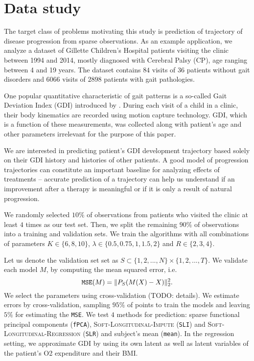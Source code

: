 \documentclass[preprint]{imsart}
\numberwithin{equation}{section}
\theoremstyle{plain}
\begin{document}
\section{Data study}

The target class of problems motivating this study is prediction of trajectory of disease progression from sparse observations. As an example application, we analyze a dataset of Gillette Children's Hospital patients visiting the clinic between 1994 and 2014, mostly diagnosed with Cerebral Palsy (CP), age ranging between 4 and 19 years. The dataset contains $84$ visits of $36$ patients without gait disorders and $6066$ visits of $2898$ patients with gait pathologies. 

One popular quantitative characteristic of gait patterns is a so-called Gait Deviation Index (GDI) introduced by \citet{schwartz2008gait}. During each visit of a child in a clinic, their body kinematics are recorded using motion capture technology. GDI, which is a function of these measurements, was collected along with patient's age and other parameters irrelevant for the purpose of this paper.

We are interested in predicting patient's GDI development trajectory based solely on their GDI history and histories of other patients. A good model of progression trajectories can constitute an important baseline for analyzing effects of treatments -- accurate prediction of a trajectory can help us understand if an improvement after a therapy is meaningful or if it is only a result of natural progression.

We randomly selected $10\%$ of observations from patients who visited the clinic at least $4$ times as our test set. Then, we split the remaining $90\%$ of observations into a training and validation sets. We train the algorithms with all combinations of parameters $K \in \{6,8,10\}$, $\lambda \in \{0.5, 0.75, 1, 1.5, 2\}$ and $R \in \{2,3,4\}$.

Let us denote the validation set set as $S \subset \{1,2,...,N\} \times \{1,2,...,T\}$. We validate each model $M$, by computing the mean squared error, i.e.
\[
\verb|MSE|(M) = \|P_S(M(X) - X)\|_2^2.
\]
We select the parameters using cross-validation (TODO: details). We estimate errors by cross-validation, sampling $95\%$ of points to train the models and leaving $5\%$ for estimating the \verb|MSE|. We test $4$ methods for prediction: sparse functional principal components (\verb|fPCA|), \textsc{Soft-Longitudinal-Impute} (\verb|SLI|) and \textsc{Soft-Longitudinal-Regression} (\verb|SLR|) and subject's mean (\verb|mean|). In the regression setting, we approximate GDI by using its own latent as well as latent variables of the patient's O2 expenditure and their BMI.
\end{document}
